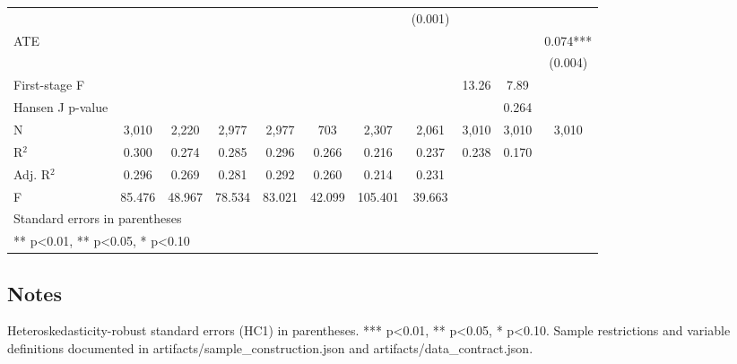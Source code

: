 \begin{table}[htbp]
\begin{tabular}{lcccccccccc}
 &  &  &  &  &  &  & (0.001) &  &  &  \\
ATE &  &  &  &  &  &  &  &  &  & 0.074*** \\
 &  &  &  &  &  &  &  &  &  & (0.004) \\
\hline
First-stage F &  &  &  &  &  &  &  & 13.26 & 7.89 &  \\
Hansen J p-value &  &  &  &  &  &  &  &  & 0.264 &  \\
\hline
N & 3,010 & 2,220 & 2,977 & 2,977 & 703 & 2,307 & 2,061 & 3,010 & 3,010 & 3,010 \\
R$^2$ & 0.300 & 0.274 & 0.285 & 0.296 & 0.266 & 0.216 & 0.237 & 0.238 & 0.170 &  \\
Adj. R$^2$ & 0.296 & 0.269 & 0.281 & 0.292 & 0.260 & 0.214 & 0.231 &  &  &  \\
F & 85.476 & 48.967 & 78.534 & 83.021 & 42.099 & 105.401 & 39.663 &  &  &  \\
\hline\hline
\multicolumn{11}{l}{\footnotesize Standard errors in parentheses} \\
\multicolumn{11}{l}{\footnotesize *** p<0.01, ** p<0.05, * p<0.10} \\
\end{tabular}
\end{table}

\subsection*{Notes}
Heteroskedasticity-robust standard errors (HC1) in parentheses. *** p<0.01, ** p<0.05, * p<0.10. Sample restrictions and variable definitions documented in artifacts/sample_construction.json and artifacts/data_contract.json.

